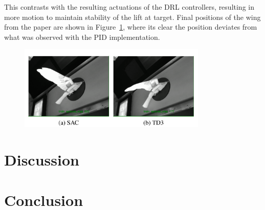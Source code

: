 This contrasts with the resulting actuations of the DRL controllers, resulting in more motion to maintain stability of the lift at target. Final positions of the wing from the paper are shown in Figure~\ref{fig:wing_DRL}, where its clear the position deviates from what was observed with the PID implementation.

\begin{figure}[h]
    \begin{center}
        \includegraphics[width=0.8\textwidth]{./img/wing_DRL.png}
    \end{center}
    \caption{}\label{fig:wing_DRL}
\end{figure}


\section{Discussion}
\section{Conclusion}
